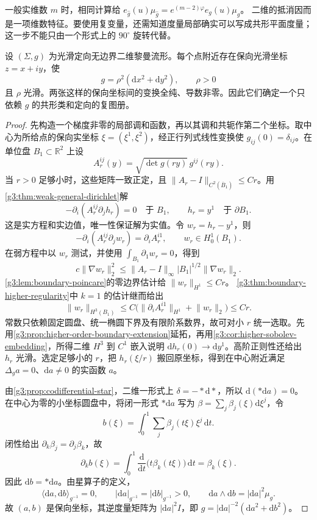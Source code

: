 一般实维数 \(m\) 时，相同计算给
\(e_{\widehat g}(u)\mu_{\widehat g}=e^{(m-2)\varphi}e_g(u)\mu_g\)。
二维的抵消因而是一项维数特征。要使用复变量，还需知道度量局部确实可以写成共形平面度量；这一步不能只由一个形式上的 \(90^\circ\) 旋转代替。

\begin{lemma}\label{g3:lem:surface-isothermal-coordinate}
	设 \((\Sigma,g)\) 为光滑定向无边界二维黎曼流形。每个点附近存在保向光滑坐标 \(z=x+iy\)，使
	\[
		g=\rho^2(\mathrm dx^2+\mathrm dy^2),\qquad \rho>0
	\]
	且 \(\rho\) 光滑。两张这样的保向坐标间的变换全纯、导数非零。因此它们确定一个只依赖 \(g\) 的共形类和定向的复图册。
\end{lemma}
\begin{proof}
	先构造一个梯度非零的局部调和函数，再以其调和共轭作第二个坐标。取中心为所给点的保向实坐标 \(\xi=(\xi^1,\xi^2)\)，经正行列式线性变换使 \(g_{ij}(0)=\delta_{ij}\)。在单位盘 \(B_1\subset\mathbb R^2\) 上设
	\[
		A_r^{ij}(y)=\sqrt{\det g(ry)}\,g^{ij}(ry).
	\]
	当 \(r>0\) 足够小时，这些矩阵一致正定，且
	\(\lVert A_r-I\rVert_{C^2(\overline B_1)}\le Cr\)。用\cref{g3:thm:weak-general-dirichlet}解
	\[
		-\partial_i(A_r^{ij}\partial_j h_r)=0
		\quad\text{于 }B_1,\qquad
		h_r=y^1\quad\text{于 }\partial B_1.
	\]
	这是实方程和实边值，唯一性保证解为实值。令 \(w_r=h_r-y^1\)，则
	\[
		-\partial_i(A_r^{ij}\partial_jw_r)=\partial_i A_r^{i1},
		\qquad w_r\in H_0^1(B_1).
	\]
	在弱方程中以 \(w_r\) 测试，并使用
	\(\int_{B_1}\partial_1w_r=0\)，得到
	\[
		c\lVert\nabla w_r\rVert_2^2
		\le \lVert A_r-I\rVert_\infty
		|B_1|^{1/2}\lVert\nabla w_r\rVert_2.
	\]
	\cref{g3:lem:boundary-poincare}的零边界估计给 \(\lVert w_r\rVert_{H^1}\le Cr\)。
	\cref{g3:thm:boundary-higher-regularity}中 \(k=1\) 的估计继而给出
	\[
		\lVert w_r\rVert_{H^3(B_1)}
		\le C\bigl(\lVert\partial_iA_r^{i1}\rVert_{H^1}
		+\lVert w_r\rVert_2\bigr)\le Cr.
	\]
	常数只依赖固定圆盘、统一椭圆下界及有限阶系数界，故可对小 \(r\) 统一选取。先用\cref{g3:prop:higher-order-boundary-extension}延拓，再用\cref{g3:cor:higher-sobolev-embedding}，所得二维 \(H^3\) 到 \(C^1\) 嵌入说明
	\(\mathrm dh_r(0)\to\mathrm dy^1\)。高阶正则性还给出 \(h_r\) 光滑。选定足够小的 \(r\)，把 \(h_r(\xi/r)\) 搬回原坐标，得到在中心附近满足 \(\Delta_g a=0\)、\(\mathrm da\ne0\) 的实函数 \(a\)。

	由\cref{g3:prop:codifferential-star}，二维一形式上
	\(\delta=-*\mathrm d*\)，所以 \(\mathrm d(*\mathrm da)=0\)。
	在中心为零的小坐标圆盘中，将闭一形式 \(*\mathrm da\) 写为
	\(\beta=\sum_j\beta_j(\xi)\mathrm d\xi^j\)，令
	\[
		b(\xi)=\int_0^1\sum_j\beta_j(t\xi)\xi^j\,\mathrm dt.
	\]
	闭性给出 \(\partial_k\beta_j=\partial_j\beta_k\)，故
	\[
		\partial_kb(\xi)
		=\int_0^1\frac{\mathrm d}{\mathrm dt}
		\bigl(t\beta_k(t\xi)\bigr)\,\mathrm dt=\beta_k(\xi).
	\]
	因此 \(\mathrm db=*\mathrm da\)。由星算子的定义，
	\[
		\langle\mathrm da,\mathrm db\rangle_{g^{-1}}=0,\qquad
		|\mathrm da|_{g^{-1}}=|\mathrm db|_{g^{-1}}>0,\qquad
		\mathrm da\wedge\mathrm db=|\mathrm da|^2\mu_g.
	\]
	故 \((a,b)\) 是保向坐标，其逆度量矩阵为
	\(|\mathrm da|^2I\)，即 \(g=|\mathrm da|^{-2}(\mathrm da^2+\mathrm db^2)\)。


\end{proof}
